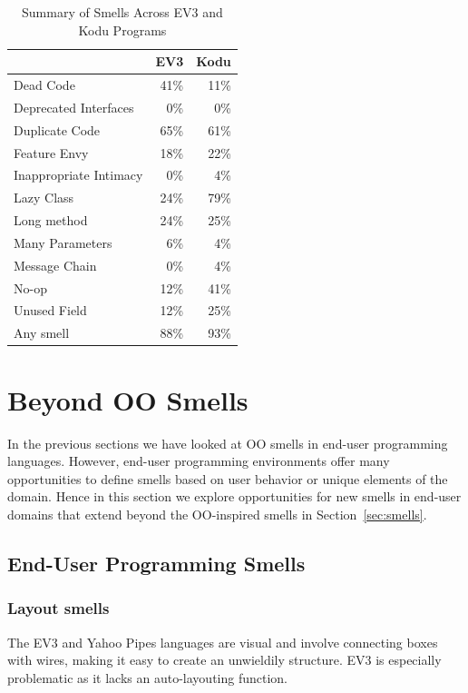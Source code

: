 \documentclass{sig-alternate}
\begin{document}
\begin{table}
\caption{Summary of Smells Across EV3 and Kodu Programs \label{tab:smellsummary}}
\begin{small}
\begin{center}
\begin{tabular}{l | r r}
&EV3&Kodu\\ \hline
Dead Code&41\%&11\%\\
Deprecated Interfaces & 0\% & 0\%\\
Duplicate Code&65\%&61\%\\
Feature Envy&18\%&22\%\\
Inappropriate Intimacy&0\%&4\%\\
Lazy Class&24\%&79\%\\
Long method&24\%&25\%\\
Many Parameters&6\%&4\%\\
Message Chain&0\%&4\%\\
No-op&12\%&41\%\\
Unused Field&12\%&25\%\\ \hline
Any smell & 88\% & 93\%
\end{tabular}
\end{center}
\end{small}
\end{table}

\section{Beyond OO Smells}
\label{sec:beyond}

\label{sec:smells:domain}
In the previous sections we have looked at OO smells in end-user programming languages. However, end-user programming environments offer many opportunities to define smells based on user behavior or unique elements of the domain. Hence in this section we explore opportunities for new smells in end-user domains that extend beyond the OO-inspired smells in Section~\ref{sec:smells}. 

\subsection{End-User Programming Smells}

\subsubsection{Layout smells}
The EV3 and Yahoo Pipes languages are visual and involve connecting boxes with wires, making it easy to create an unwieldily structure. EV3 is especially problematic as it lacks an auto-layouting function.
\end{document}
